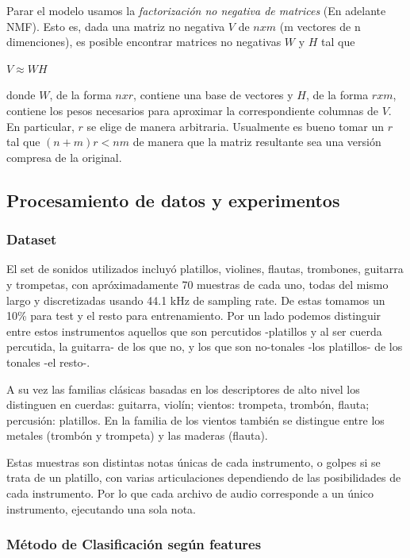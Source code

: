Parar el modelo usamos la \textit{factorización no negativa de matrices} (En adelante NMF). Esto es, dada una matriz no negativa $V$ de $n x m$ (m vectores de n dimenciones), es posible encontrar matrices no negativas $W$ y $H$ tal que
\begin{center}
    $V \approx WH$
\end{center}
donde $W$, de la forma $n x r$, contiene una base de vectores y $H$, de la forma $r x m$, contiene los pesos necesarios para aproximar la correspondiente columnas de $V$. En particular, $r$ se elige de manera arbitraria. Usualmente es bueno tomar un $r$ tal que $(n+m)r < nm$ de manera que la matriz resultante sea una versi\'on compresa de la original.
        
\subsection{Procesamiento de datos y experimentos}

\subsubsection{Dataset}

El set de sonidos utilizados incluyó platillos, violines, flautas, trombones, guitarra y trompetas, con apróximadamente 70 muestras de cada uno, todas del mismo largo y discretizadas usando 44.1 kHz de sampling rate. De estas tomamos un 10\% para test y el resto para entrenamiento. Por un lado podemos distinguir entre estos instrumentos aquellos que son percutidos -platillos y al ser cuerda percutida, la guitarra- de los que no, y los que son no-tonales -los platillos- de los tonales -el resto-.

A su vez las familias clásicas basadas en los descriptores de alto nivel los distinguen en cuerdas: guitarra, violín; vientos: trompeta, trombón, flauta; percusión: platillos. En la familia de los vientos también se distingue entre los metales (trombón y trompeta) y las maderas (flauta).

Estas muestras son distintas notas únicas de cada instrumento, o golpes si se trata de un platillo, con varias articulaciones dependiendo de las posibilidades de cada instrumento. Por lo que cada archivo de audio corresponde a un único instrumento, ejecutando una sola nota.

\subsubsection{Método de Clasificaci\'on según features}

